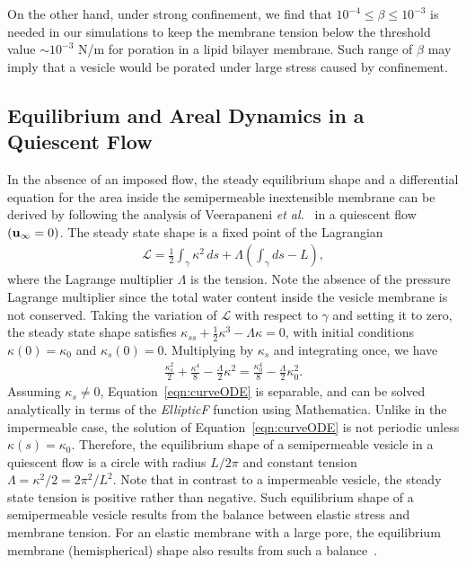 \documentclass[prb,preprint,showpacs,preprintnumbers,amsmath,amssymb,longbibliography]{revtex4-1}
\begin{document}
On the other hand,
under strong confinement,  we find that $10^{-4}\le\beta\le10^{-3}$ is needed in our
simulations to keep the membrane tension below the threshold value $\sim 10^{-3}$ N/m for
poration in a lipid bilayer membrane. Such range of $\beta$ may imply
that a vesicle would be porated under large stress
caused by confinement.


\subsection{Equilibrium and Areal Dynamics in a Quiescent Flow\label{subsec:area_dynamics}}
In the absence of an imposed flow, the steady equilibrium shape and a
differential equation for the area inside the semipermeable inextensible membrane can be derived
by following the analysis of Veerapaneni {\em et al.}~\cite{vee-raj-bir-pur2009} in a quiescent flow $({\bf u}_{\infty} = 0)$.
%
%
The steady state shape is a
fixed point of the Lagrangian
\begin{align}
  \mathcal{L} = \frac{1}{2}\int_{\gamma} \kappa^2 \, ds +
    \Lambda \left(\int_{\gamma} ds  - L \right),
\end{align}
where the Lagrange multiplier $\Lambda$ is the tension. Note the absence
of the pressure Lagrange multiplier since the total water content inside the vesicle membrane is not conserved.
Taking the variation of $\mathcal{L}$ with respect to $\gamma$ and
setting it to zero, the steady state shape satisfies $\kappa_{ss} +
\frac{1}{2}\kappa^3 - \Lambda \kappa = 0$, with initial conditions
$\kappa(0) = \kappa_0$ and $\kappa_s(0) = 0$.  Multiplying by $\kappa_s$
and integrating once, we have
\begin{align}
  \frac{\kappa_s^2}{2} + \frac{\kappa^4}{8} - 
    \frac{\Lambda}{2}\kappa^2 = \frac{\kappa_0^4}{8} - 
    \frac{\Lambda}{2}\kappa_0^2.
  \label{eqn:curveODE}
\end{align}
Assuming $\kappa_s \neq 0$, Equation~\eqref{eqn:curveODE} is separable,
and can be solved analytically in terms of the {\em EllipticF} function
using Mathematica. Unlike in the impermeable case, the solution of
Equation~\eqref{eqn:curveODE} is not periodic unless $\kappa(s) =
\kappa_0$. Therefore, the equilibrium shape of a semipermeable vesicle
in a quiescent flow is a circle with radius $L/2\pi$ and constant
tension $\Lambda = \kappa^2/2 = 2\pi^2/L^2.$ Note that in contrast to a
impermeable vesicle, the steady state tension is positive rather than
negative. Such equilibrium shape of a semipermeable vesicle results from
the balance between elastic stress and membrane tension. For an elastic
membrane with a large pore, the equilibrium membrane (hemispherical)
shape also results from such a balance~\cite{Ryham2018_JFM}.
\end{document}

